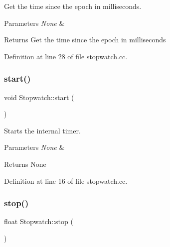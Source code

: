 Get the time since the epoch in milliseconds. 


\begin{DoxyParams}{Parameters}
{\em None} & \\
\hline
\end{DoxyParams}
\begin{DoxyReturn}{Returns}
Get the time since the epoch in milliseconds 
\end{DoxyReturn}


Definition at line 28 of file stopwatch.\+cc.

\mbox{\label{classStopwatch_aff8757dda8e913cc671eb3baeb662109}} 
\subsubsection{\texorpdfstring{start()}{start()}}
{\footnotesize\ttfamily void Stopwatch\+::start (\begin{DoxyParamCaption}{ }\end{DoxyParamCaption})\hspace{0.3cm}{\ttfamily [noexcept]}}



Starts the internal timer. 


\begin{DoxyParams}{Parameters}
{\em None} & \\
\hline
\end{DoxyParams}
\begin{DoxyReturn}{Returns}
None 
\end{DoxyReturn}


Definition at line 16 of file stopwatch.\+cc.

\mbox{\label{classStopwatch_ae614c46daae8d773f15d7ff603245cd0}} 
\subsubsection{\texorpdfstring{stop()}{stop()}}
{\footnotesize\ttfamily float Stopwatch\+::stop (\begin{DoxyParamCaption}{ }\end{DoxyParamCaption})\hspace{0.3cm}{\ttfamily [noexcept]}}



